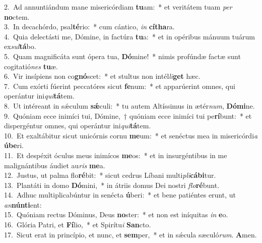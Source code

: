 {2.~}Ad annuntiándum mane misericórdiam \textbf{tu}am:~* et veritátem tuam \textit{per} \textbf{no}ctem.\\
{3.~}In decachórdo, psal\textbf{té}rio:~* cum cántico, \textit{in} \textbf{cí}\textbf{tha}ra.\\
{4.~}Quia delectásti me, Dómine, in factúra \textbf{tu}a:~* et in opéribus mánuum tuárum ex\textit{sul}\textbf{tá}bo.\\
{5.~}Quam magnificáta sunt ópera tua, \textbf{Dó}mine!~* nimis profúndæ factæ sunt cogitatió\textit{nes} \textbf{tu}æ.\\
{6.~}Vir insípiens non co\textbf{gnó}scet:~* et stultus non intél\textit{li}\textbf{get} hæc.\\
{7.~}Cum exórti fúerint peccatóres sicut \textbf{fe}num:~* et apparúerint omnes, qui operántur ini\textit{qui}\textbf{tá}tem.\\
{8.~}Ut intéreant in sǽculum \textbf{sǽ}culi:~* tu autem Altíssimus in ætér\textit{num}, \textbf{Dó}\textbf{mi}ne.\\
{9.~}Quóniam ecce inimíci tui, Dómine,~† quóniam ecce inimíci tui pe\textbf{rí}bunt:~* et dispergéntur omnes, qui operántur ini\textit{qui}\textbf{tá}tem.\\
{10.~}Et exaltábitur sicut unicórnis cornu \textbf{me}um:~* et senéctus mea in misericórdi\textit{a} \textbf{ú}\textbf{be}ri.\\
{11.~}Et despéxit óculus meus inimícos \textbf{me}os:~* et in insurgéntibus in me malignántibus áudiet au\textit{ris} \textbf{me}a.\\
{12.~}Justus, ut palma flo\textbf{ré}bit:~* sicut cedrus Líbani multi\textit{pli}\textbf{cá}\textbf{bi}tur.\\
{13.~}Plantáti in domo \textbf{Dó}mini,~* in átriis domus Dei nostri \textit{flo}\textbf{ré}bunt.\\
{14.~}Adhuc multiplicabúntur in senécta \textbf{ú}beri:~* et bene patiéntes erunt, ut \textit{an}\textbf{nún}\textbf{ti}ent:\\
{15.~}Quóniam rectus Dóminus, Deus \textbf{no}ster:~* et non est iníquitas \textit{in} \textbf{e}o.\\
{16.~}Glória Patri, et \textbf{Fí}lio,~* et Spirítu\textit{i} \textbf{San}cto.\\
{17.~}Sicut erat in princípio, et nunc, et \textbf{sem}per,~* et in sǽcula sæculó\textit{rum}. \textbf{A}men.\\
